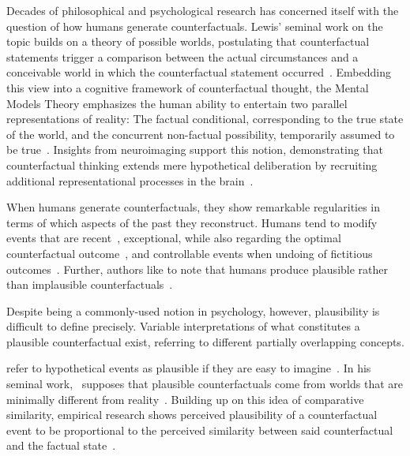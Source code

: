 Decades of philosophical and psychological research has concerned itself with the question of how humans generate counterfactuals. 
Lewis' seminal work on the topic builds on a theory of possible worlds, postulating that counterfactual statements trigger a comparison between the actual circumstances and a conceivable world in which the counterfactual statement occurred~\citep{lewis_counterfactuals_1973}.
Embedding this view into a cognitive framework of counterfactual thought, the Mental Models Theory emphasizes the human ability to entertain two parallel representations of reality: The factual conditional, corresponding to the true state of the world, and the concurrent non-factual possibility, temporarily assumed to be true~\citep{byrne_mental_2002,byrne_precis_2007,johnson-laird_conditionals_2002,walsh_mental_2005}.
Insights from neuroimaging support this notion, demonstrating that counterfactual thinking extends mere hypothetical deliberation by recruiting additional representational processes in the brain~\citep{kulakova_processing_2013}.

When humans generate counterfactuals, they show remarkable regularities in terms of which aspects of the past they reconstruct. 
Humans tend to modify events that are recent~\citep{miller_temporal_1990, byrne_temporality_2000}, exceptional, while also regarding the optimal counterfactual outcome~\citep{kahneman_simulation_1982, dixon_if_2011}, and 
controllable events when undoing of fictitious outcomes~\citep{girotto_event_1991}.
Further, authors like to note that humans produce plausible rather than implausible counterfactuals~\citep{byrne_counterfactual_2016, de_brigard_coming_2013}.

Despite being a commonly-used notion in psychology, however, plausibility is difficult to define precisely.
Variable interpretations of what constitutes a plausible counterfactual exist, referring to different partially overlapping concepts.

\citeauthor{kahneman_simulation_1982} refer to hypothetical events as plausible if they are easy to imagine~\citep{kahneman_simulation_1982}. 
In his seminal work,~\citeauthor{lewis_counterfactuals_1973} supposes that plausible counterfactuals come from worlds that are minimally different from reality~\citep{lewis_counterfactuals_1973}. 
Building up on this idea of comparative similarity, empirical research shows perceived plausibility of a counterfactual event to be proportional to the perceived similarity between said counterfactual and the factual state~\citep{stanley_counterfactual_2017, de_brigard_perceived_2021}.

